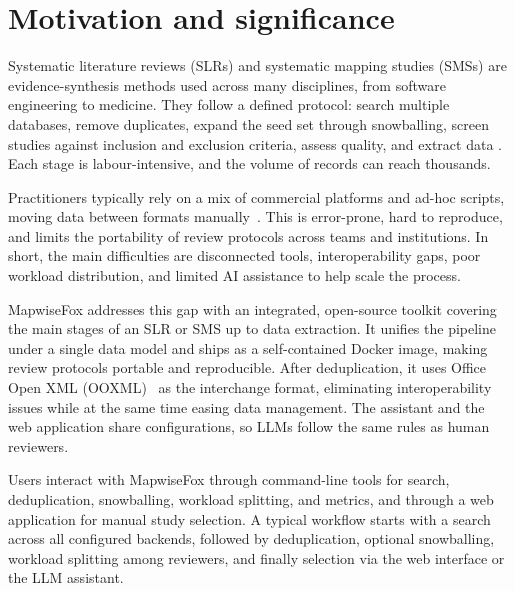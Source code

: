 \documentclass[preprint,12pt, a4paper]{elsarticle}
\begin{document}

\section{Motivation and significance}

Systematic literature reviews (SLRs) and systematic mapping studies
(SMSs) are evidence-synthesis methods used across many disciplines,
from software engineering to medicine. They follow a defined protocol:
search multiple databases, remove duplicates, expand the seed set
through snowballing, screen studies against inclusion and exclusion
criteria, assess quality, and extract data
\cite{kitchenham2007,petersen2008,page2021}.
Each stage is labour-intensive, and the volume of records can reach
thousands.

Practitioners typically rely on a mix of commercial platforms and
ad-hoc scripts, moving data between formats manually~\cite{khalil2022,futterer2026}.
This is error-prone, hard to reproduce, and limits the portability of review
protocols across teams and institutions. In short, the main
difficulties are disconnected tools, interoperability gaps, poor
workload distribution, and limited AI assistance to help scale the process.

MapwiseFox addresses this gap with an integrated, open-source toolkit covering
the main stages of an SLR or SMS up to data extraction. It unifies the pipeline
under a single data model and ships as a self-contained Docker image, making
review protocols portable and reproducible. After deduplication, it uses
Office Open XML (OOXML)~\cite{iso29500} as the interchange format, eliminating
interoperability issues while at the same time easing data management. The assistant
and the web application share configurations, so LLMs follow the same rules as human
reviewers.

Users interact with MapwiseFox through command-line tools for search,
deduplication, snowballing, workload splitting, and metrics, and
through a web application for manual study selection. A typical
workflow starts with a search across all configured backends, followed
by deduplication, optional snowballing, workload splitting among
reviewers, and finally selection via the web interface or the
LLM assistant.
\end{document}
